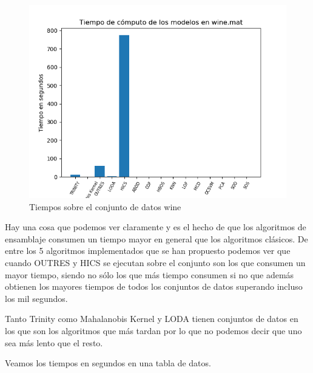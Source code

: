 \begin{figure}[H]
	\centering
	\includegraphics[scale=0.7]{imagenes/imgs-exp1/times/wine}
	\caption{Tiempos sobre el conjunto de datos wine}
	\label{wine_times}
\end{figure}

Hay una cosa que podemos ver claramente y es el hecho de que los algoritmos de ensamblaje consumen un tiempo mayor en general que los algoritmos clásicos. De entre los 5 algoritmos implementados que se han propuesto podemos ver que cuando OUTRES y HICS se ejecutan sobre el conjunto son los que consumen un mayor tiempo, siendo no sólo los que más tiempo consumen si no que además obtienen los mayores tiempos de todos los conjuntos de datos superando incluso los mil segundos.

Tanto Trinity como Mahalanobis Kernel y LODA tienen conjuntos de datos en los que son los algoritmos que más tardan por lo que no podemos decir que uno sea más lento que el resto. 

Veamos los tiempos en segundos en una tabla de datos.

\clearpage

